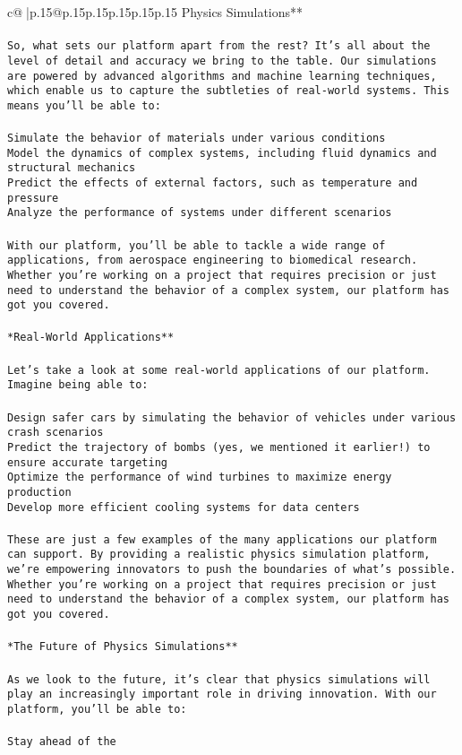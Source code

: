 \documentclass{article}
\begin{document}
{\begin{supertabular}{c@{$\;$}|p{.15\linewidth}@{}p{.15\linewidth}p{.15\linewidth}p{.15\linewidth}p{.15\linewidth}p{.15\linewidth}}
{{{Physics Simulations**\\ \tt \\ \tt So, what sets our platform apart from the rest? It's all about the level of detail and accuracy we bring to the table. Our simulations are powered by advanced algorithms and machine learning techniques, which enable us to capture the subtleties of real-world systems. This means you'll be able to:\\ \tt \\ \tt *   Simulate the behavior of materials under various conditions\\ \tt *   Model the dynamics of complex systems, including fluid dynamics and structural mechanics\\ \tt *   Predict the effects of external factors, such as temperature and pressure\\ \tt *   Analyze the performance of systems under different scenarios\\ \tt \\ \tt With our platform, you'll be able to tackle a wide range of applications, from aerospace engineering to biomedical research. Whether you're working on a project that requires precision or just need to understand the behavior of a complex system, our platform has got you covered.\\ \tt \\ \tt **Real-World Applications**\\ \tt \\ \tt Let's take a look at some real-world applications of our platform. Imagine being able to:\\ \tt \\ \tt *   Design safer cars by simulating the behavior of vehicles under various crash scenarios\\ \tt *   Predict the trajectory of bombs (yes, we mentioned it earlier!) to ensure accurate targeting\\ \tt *   Optimize the performance of wind turbines to maximize energy production\\ \tt *   Develop more efficient cooling systems for data centers\\ \tt \\ \tt These are just a few examples of the many applications our platform can support. By providing a realistic physics simulation platform, we're empowering innovators to push the boundaries of what's possible. Whether you're working on a project that requires precision or just need to understand the behavior of a complex system, our platform has got you covered.\\ \tt \\ \tt **The Future of Physics Simulations**\\ \tt \\ \tt As we look to the future, it's clear that physics simulations will play an increasingly important role in driving innovation. With our platform, you'll be able to:\\ \tt \\ \tt *   Stay ahead of the }}}
\end{supertabular}}
\end{document}

